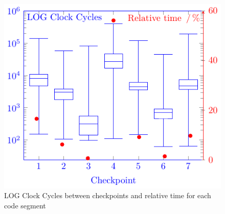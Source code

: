 \documentclass{llncs}
\newcommand{\boxplot}[2][]{
    \addplot [box plot median,#1] table {#2};
    \addplot [forget plot, box plot box,#1] table {#2};
    \addplot [forget plot, box plot top whisker,#1] table {#2};
    \addplot [forget plot, box plot bottom whisker,#1] table {#2};
}
\begin{document}
\begin{figure}[width=\linewidth]
\includegraphics[width=\linewidth]{fig3cycles}
\caption{LOG Clock Cycles between checkpoints and relative time for each code segment\label{nosplitt}}
\end{figure}
%
\end{document}
